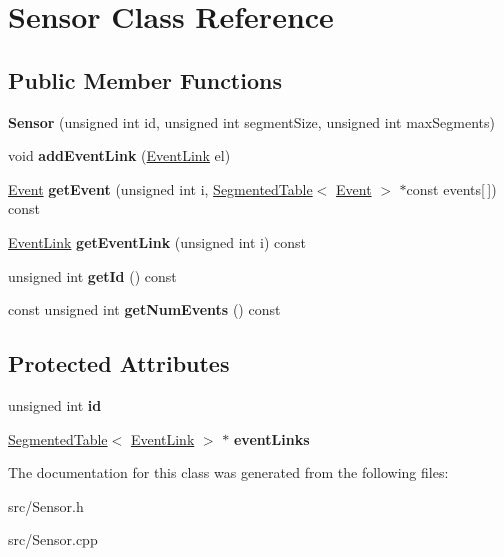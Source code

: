 \hypertarget{class_sensor}{}\section{Sensor Class Reference}
\label{class_sensor}
\subsection*{Public Member Functions}
\begin{DoxyCompactItemize}
\item 
\hypertarget{class_sensor_a4fded2d3f534beb2eeb7d260ec15a3ca}{}{\bfseries Sensor} (unsigned int id, unsigned int segment\+Size, unsigned int max\+Segments)\label{class_sensor_a4fded2d3f534beb2eeb7d260ec15a3ca}

\item 
\hypertarget{class_sensor_ac45f594593fc12fce0cc09f067341728}{}void {\bfseries add\+Event\+Link} (\hyperlink{class_event_link}{Event\+Link} el)\label{class_sensor_ac45f594593fc12fce0cc09f067341728}

\item 
\hypertarget{class_sensor_ab6fdc5b10d69b2f43c4f162c0f591611}{}\hyperlink{class_event}{Event} {\bfseries get\+Event} (unsigned int i, \hyperlink{class_segmented_table}{Segmented\+Table}$<$ \hyperlink{class_event}{Event} $>$ $\ast$const events\mbox{[}$\,$\mbox{]}) const \label{class_sensor_ab6fdc5b10d69b2f43c4f162c0f591611}

\item 
\hypertarget{class_sensor_ac96ce6b977541678c9d4a757c741c459}{}\hyperlink{class_event_link}{Event\+Link} {\bfseries get\+Event\+Link} (unsigned int i) const \label{class_sensor_ac96ce6b977541678c9d4a757c741c459}

\item 
\hypertarget{class_sensor_ac9a9f3036726b9edd56329f7c56c6101}{}unsigned int {\bfseries get\+Id} () const \label{class_sensor_ac9a9f3036726b9edd56329f7c56c6101}

\item 
\hypertarget{class_sensor_af2c84044ff89b5dd69f1c15975c38546}{}const unsigned int {\bfseries get\+Num\+Events} () const \label{class_sensor_af2c84044ff89b5dd69f1c15975c38546}

\end{DoxyCompactItemize}
\subsection*{Protected Attributes}
\begin{DoxyCompactItemize}
\item 
\hypertarget{class_sensor_a8d11df163a5a3f369a76c8de4d8568cb}{}unsigned int {\bfseries id}\label{class_sensor_a8d11df163a5a3f369a76c8de4d8568cb}

\item 
\hypertarget{class_sensor_a10c16eb34724e044fdb59dd7dab54348}{}\hyperlink{class_segmented_table}{Segmented\+Table}$<$ \hyperlink{class_event_link}{Event\+Link} $>$ $\ast$ {\bfseries event\+Links}\label{class_sensor_a10c16eb34724e044fdb59dd7dab54348}

\end{DoxyCompactItemize}


The documentation for this class was generated from the following files\+:\begin{DoxyCompactItemize}
\item 
src/Sensor.\+h\item 
src/Sensor.\+cpp\end{DoxyCompactItemize}
